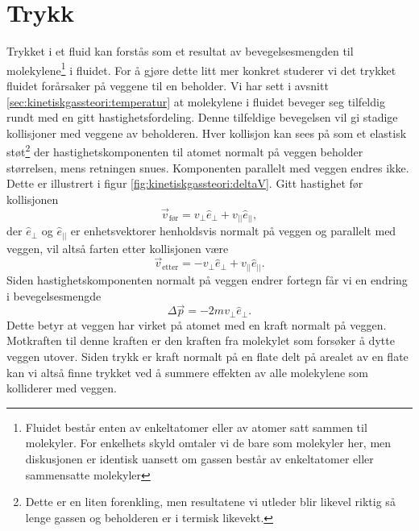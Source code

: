 \section{Trykk}
Trykket i et fluid kan forstås som et resultat av bevegelsesmengden til molekylene\footnote{Fluidet består enten av enkeltatomer eller av atomer satt sammen til molekyler. For enkelhets skyld omtaler vi de bare som molekyler her, men diskusjonen er identisk uansett om gassen består av enkeltatomer eller sammensatte molekyler} i fluidet. For å gjøre dette litt mer konkret studerer vi det  trykket fluidet forårsaker på veggene til en beholder. Vi har sett i avsnitt \ref{sec:kinetiskgassteori:temperatur} at molekylene i fluidet beveger seg tilfeldig rundt med en gitt hastighetsfordeling. Denne tilfeldige bevegelsen vil gi stadige kollisjoner med veggene av beholderen. Hver kollisjon kan sees på som et elastisk støt\footnote{Dette er en liten forenkling, men resultatene vi utleder blir likevel riktig så lenge gassen og beholderen er i termisk likevekt.} der hastighetskomponenten til atomet normalt på veggen beholder størrelsen, mens retningen snues. Komponenten parallelt med veggen endres ikke. Dette er illustrert i figur \ref{fig:kinetiskgassteori:deltaV}. Gitt hastighet før kollisjonen
\begin{displaymath}
	\vec{v}_\text{før} = v_\perp \hat{e}_\perp + v_{||} \hat{e}_{||},
\end{displaymath}
der $ \hat{e}_\perp$ og $\hat{e}_{||}$ er enhetsvektorer henholdsvis normalt på veggen og parallelt med veggen, vil altså farten etter kollisjonen være
\begin{displaymath}
	\vec{v}_\text{etter} = -v_\perp \hat{e}_\perp + v_{||} \hat{e}_{||}.
\end{displaymath}
Siden hastighetskomponenten normalt på veggen endrer fortegn får vi en endring i bevegelsesmengde 
\begin{displaymath}
	\Delta \vec{p} = -2mv_\perp\hat{e}_\perp.
\end{displaymath}
Dette betyr at veggen har virket på atomet med en kraft normalt på veggen. Motkraften til denne kraften er den kraften fra molekylet som forsøker å dytte veggen utover. Siden trykk er kraft normalt på en flate delt på arealet av en flate kan vi altså finne trykket ved å summere effekten av alle molekylene som kolliderer med veggen.

